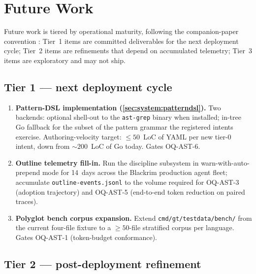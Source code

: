 \section{Future Work}
\label{sec:future}

Future work is tiered by operational maturity, following the
companion-paper convention \cite{blackrim_moa_paper}: Tier~1
items are committed deliverables for the next deployment cycle;
Tier~2 items are refinements that depend on accumulated telemetry;
Tier~3 items are exploratory and may not ship.

\subsection{Tier 1 --- next deployment cycle}
\label{sec:future:tier1}

\begin{enumerate}[leftmargin=*]
  \item \textbf{Pattern-DSL implementation
        (\cref{sec:system:patterndsl}).} Two backends: optional
        shell-out to the \texttt{ast-grep} binary when installed;
        in-tree Go fallback for the subset of the pattern grammar
        the registered intents exercise. Authoring-velocity target:
        $\leq 50$~LoC of YAML per new tier-0 intent, down from
        $\sim 200$~LoC of Go today. Gates OQ-AST-6.
  \item \textbf{Outline telemetry fill-in.} Run the discipline
        subsystem in warn-with-auto-prepend mode for 14~days across
        the Blackrim production agent fleet; accumulate
        \texttt{outline-events.jsonl} to the volume required for
        OQ-AST-3 (adoption trajectory) and OQ-AST-5 (end-to-end
        token reduction on paired traces).
  \item \textbf{Polyglot bench corpus expansion.} Extend
        \texttt{cmd/gt/testdata/bench/} from the current
        four-file fixture to a $\geq 50$-file stratified corpus
        per language. Gates OQ-AST-1 (token-budget conformance).
\end{enumerate}

\subsection{Tier 2 --- post-deployment refinement}
\label{sec:future:tier2}

